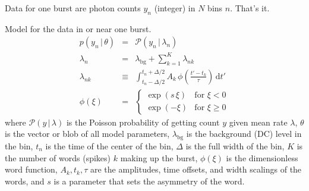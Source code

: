\documentclass[12pt]{article}
\newcommand{\given}{\,|\,}
\newcommand{\dd}{\mathrm{d}}
\renewcommand{\count}{y}
\newcommand{\pars}{\theta}
\newcommand{\mean}{\lambda}
\newcommand{\Poisson}{{\mathcal P}}
\newcommand{\bg}{\mathrm{bg}}
\newcommand{\word}{\phi}
\begin{document}
Data for one burst are photon counts $\count_n$ (integer) in $N$ bins $n$.  That's it.

Model for the data in or near one burst.
\begin{eqnarray}
p(\count_n\given\pars) &=& \Poisson(\count_n\given\mean_n)
\\
\mean_n &=& \mean_{\bg} + \sum_{k=1}^K \mean_{nk}
\\
\mean_{nk} &\equiv& \int_{t_n-\Delta/2}^{t_n+\Delta/2} A_k\,\word(\frac{t'-t_k}{\tau})\,\dd t'
\\
\word(\xi) &=& \left\{\begin{array}{ll}\exp(s\,\xi) & \mbox{for $\xi<0$}\\ \exp(-\xi) & \mbox{for $\xi\geq 0$}\end{array}\right.
\end{eqnarray}
where $\Poisson(\count\given\mean)$ is the Poisson probability of getting count $y$ given mean rate $\mean$,
  $\pars$ is the vector or blob of all model parameters,
  $\mean_{\bg}$ is the background (DC) level in the bin,
  $t_n$ is the time of the center of the bin,
  $\Delta$ is the full width of the bin,
  $K$ is the number of words (spikes) $k$ making up the burst,
  $\phi(\xi)$ is the dimensionless word function,
  $A_k, t_k, \tau$ are the amplitudes, time offsets, and width scalings of the words,
  and $s$ is a parameter that sets the asymmetry of the word.
\end{document}
